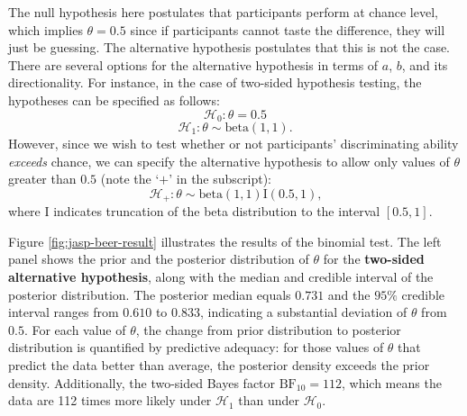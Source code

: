 \documentclass[
]{book}
\begin{document}
The null hypothesis here postulates that participants perform at chance level, which implies \(\theta = 0.5\) since if participants cannot taste the difference, they will just be guessing. The alternative hypothesis postulates that this is not the case. There are several options for the alternative hypothesis in terms of \(a\), \(b\), and its directionality. For instance, in the case of two-sided hypothesis testing, the hypotheses can be specified as follows:
\begin{equation*}
\mathcal{H}_0:  \theta = 0.5
\end{equation*}
\begin{equation}
\mathcal{H}_1:  \theta \sim \text{beta}(1, 1)\text{.}
\label{eq:hypoSetupTwoSided}
\end{equation}
However, since we wish to test whether or not participants' discriminating ability \emph{exceeds} chance, we can specify the alternative hypothesis to allow only values of \(\theta\) greater than \(0.5\) (note the `\(+\)' in the subscript):
\begin{equation}
\mathcal{H}_+:  \theta \sim \text{beta}(1, 1) \text{I}  (0.5, 1)\text{,}
\label{eq:hypoSetup}
\end{equation}
where I indicates truncation of the beta distribution to the interval \([0.5, 1]\).

Figure \ref{fig:jasp-beer-result} illustrates the results of the binomial test. The left panel shows the prior and the posterior distribution of \(\theta\) for the \textbf{two-sided alternative hypothesis}, along with the median and credible interval of the posterior distribution. The posterior median equals \(0.731\) and the \(95\%\) credible interval ranges from \(0.610\) to \(0.833\), indicating a substantial deviation of \(\theta\) from \(0.5\). For each value of \(\theta\), the change from prior distribution to posterior distribution is quantified by predictive adequacy: for those values of \(\theta\) that predict the data better than average, the posterior density exceeds the prior density. Additionally, the two-sided Bayes factor \(\text{BF}_{10} = 112\), which means the data are 112 times more likely under \(\mathcal{H}_1\) than under \(\mathcal{H}_0\).
\end{document}
